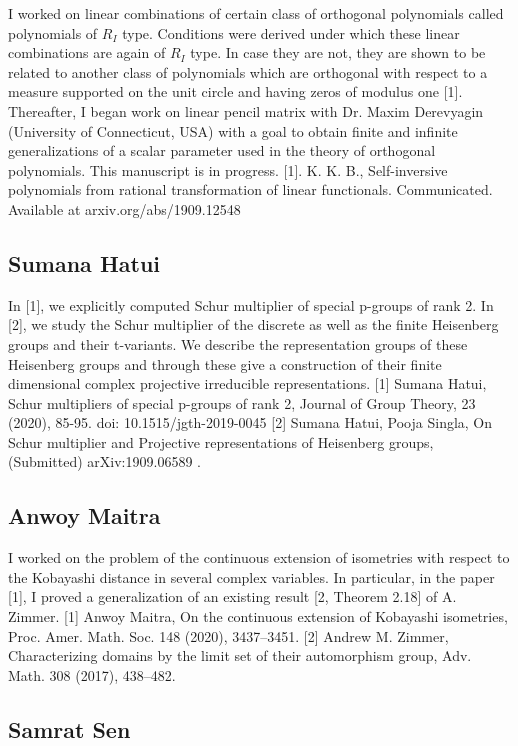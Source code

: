 I worked on linear combinations of certain class of orthogonal polynomials called polynomials of $R_I$ type. Conditions were derived under which these linear combinations are again of $R_I$ type. In case they are not, they are shown to be related to another class of polynomials which are orthogonal with respect to a measure supported on the unit circle and having zeros of modulus one [1].  Thereafter, I began work on linear pencil matrix with Dr. Maxim Derevyagin  (University of Connecticut, USA) with a goal to obtain finite and infinite generalizations of a scalar parameter used in the theory of orthogonal polynomials. This manuscript is in progress.  [1]. K. K. B., Self-inversive polynomials from rational transformation of linear         functionals. Communicated. Available at arxiv.org/abs/1909.12548 


\subsection{Sumana Hatui}

In [1], we explicitly computed Schur multiplier of special p-groups of rank 2. In [2], we study the Schur multiplier of the discrete as well as the finite Heisenberg groups and their t-variants. We describe the representation groups of these Heisenberg groups and through these give a construction of their finite dimensional complex projective irreducible representations.   [1] Sumana Hatui, Schur multipliers of special p-groups of rank 2, Journal of Group Theory, 23 (2020), 85-95. doi: 10.1515/jgth-2019-0045 [2] Sumana Hatui, Pooja Singla, On Schur multiplier and Projective representations of Heisenberg groups, (Submitted) arXiv:1909.06589 .


\subsection{Anwoy Maitra}

I worked on the problem of the continuous extension of isometries with respect to the Kobayashi distance in several complex variables. In particular, in the paper [1], I proved a generalization of an existing result [2, Theorem 2.18] of A. Zimmer. [1] Anwoy Maitra, On the continuous extension of Kobayashi isometries, Proc. Amer. Math. Soc. 148 (2020), 3437--3451. [2] Andrew M. Zimmer, Characterizing domains by the limit set of their automorphism group, Adv. Math. 308 (2017), 438--482.


\subsection{Samrat Sen}

